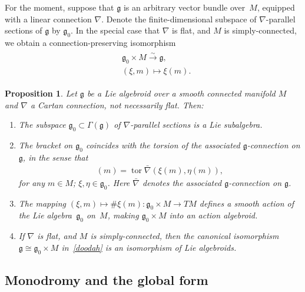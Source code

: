\documentclass[11pt]{article}
\DeclareMathOperator{\torsion}{tor}
\numberwithin{equation}{section}
\newtheorem{PropositionBlaom}[TheoremBlaom]{Proposition}
 { \theoremstyle{definition}
\newtheorem{CounterexampleBlaom}[TheoremBlaom]{Counterexample}
\newtheorem{RemarkBlaom}[TheoremBlaom]{Remark} }
\begin{document}
For the moment, suppose that $\mathfrak g$ is an arbitrary vector
bundle over~$M$, equipped with a linear connection $\nabla$. Denote
the f\/inite-dimensional subspace of $\nabla $-parallel sections of
$\mathfrak g$ by ${\mathfrak g}_0$. In the special case that $\nabla$
is f\/lat, and $M$ is simply-connected, we obtain a
connection-preserving isomorphism
\begin{gather}
  \begin{split}
 &   {\mathfrak g}_0 \times M\xrightarrow{\sim}{\mathfrak g}, \\
 &   (\xi,m)\mapsto \xi(m).
  \end{split}
  \label{doodah}
\end{gather}
\begin{PropositionBlaom} \label{Proposition2.5}
  Let $\mathfrak g$ be a Lie algebroid over a smooth connected
  manifold $M$ and $\nabla$ a Cartan connection, not necessarily
  flat. Then:
  \begin{enumerate}\itemsep=0pt
  \item[$(1)$] The subspace ${\mathfrak g}_0 \subset \Gamma({\mathfrak g})$
    of $\nabla$-parallel sections is a Lie subalgebra.
  \item[$(2)$] %
  The bracket on ${\mathfrak g}_0$ coincides with
    the torsion of the associated $\mathfrak g$-connection on
    ${\mathfrak g} $, in the sense that
    \begin{gather*}
      [\xi,\eta](m)=\torsion \bar\nabla (\xi(m),\eta(m)),
    \end{gather*}
    for any $m\in M$; $\xi,\eta \in {\mathfrak g}_0$. Here
    $\bar\nabla$ denotes the associated ${\mathfrak g} $-connection on
    $\mathfrak g$.
  \item[$(3)$] %
  The mapping $(\xi,m) \mapsto \# \xi(m) \colon
    {\mathfrak g}_0 \times M \rightarrow TM$ defines a smooth action
    of the Lie algebra~${\mathfrak g}_0$ on~$M$, making ${\mathfrak
      g}_0 \times M$ into an action algebroid.

  \item[$(4)$]%
  If $\nabla$ is flat, and $M$ is simply-connected,
    then the canonical isomorphism ${\mathfrak g} \cong {\mathfrak
      g}_0 \times M$ in~\eqref{doodah} is an isomorphism of Lie
    algebroids.
\end{enumerate}
\end{PropositionBlaom}

\subsection{Monodromy and  the global form}\label{holiday}
\end{document}
